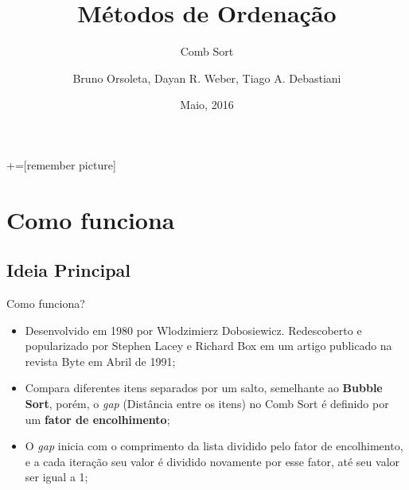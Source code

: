 \documentclass[aspectratio=169,table]{beamer}
\title{Métodos de Ordenação}
\subtitle{Comb Sort}
\author[Bruno Dall Orsoletta, Dayan R. Weber, Tiago A. Debastiani]{Bruno Orsoleta, Dayan R. Weber, Tiago A. Debastiani}
\institute[UFFS -- \textit{Campus} Chapecó] %
{%
  Estrutura de Dados I\\%
  Ciência da Computação\\%
  Universidade Federal da Fronteira Sul\\%
  \textit{Campus} Chapecó%
}
\date{Maio, 2016}
\begin{document}
+=[remember picture]

\everymath{\displaystyle}


\begin{frame}[label=titlepage]
  \titlepage
\end{frame}


\section{Como funciona}
	\subsection{Ideia Principal}
		\begin{frame}{Como funciona?}
			\begin{itemize}
				\item Desenvolvido em 1980 por Wlodzimierz Dobosiewicz. Redescoberto e popularizado por Stephen Lacey e Richard Box em um artigo publicado na revista Byte em Abril de 1991;
				\item Compara diferentes itens separados por um salto, semelhante ao \textbf{Bubble Sort}, porém, o \textit{gap} (Distância entre os itens) no Comb Sort é definido por um \textbf{fator de encolhimento};
				\item O \textit{gap} inicia com o comprimento da lista dividido pelo fator de encolhimento, e a cada iteração seu valor é dividido novamente por esse fator, até seu valor ser igual a 1;
			\end{itemize}
		\end{frame}
\end{document}
